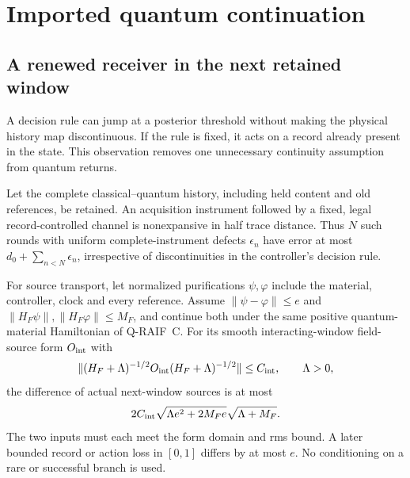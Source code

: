 \section{Imported quantum continuation}\label{app:quantum_imports}
\subsection{A renewed receiver in the next retained window}
\label{subsec:continuation}

A decision rule can jump at a posterior threshold without making the
physical history map discontinuous. If the rule is fixed, it acts on a
record already present in the state. This observation removes one
unnecessary continuity assumption from quantum returns.

\begin{proposition}
\label{prop:continuation}
Let the complete classical--quantum history, including held content
and old references, be retained. An acquisition instrument followed
by a fixed, legal record-controlled channel is nonexpansive in half
trace distance. Thus $N$ such rounds with uniform complete-instrument
defects $\epsilon_n$ have error at most $d_0+\sum_{n<N}\epsilon_n$,
irrespective of discontinuities in the controller's decision rule.

For source transport, let normalized purifications $\psi,\varphi$
include the material, controller, clock and every reference. Assume
$\|\psi-\varphi\|\le e$ and
$\|H_F\psi\|,\|H_F\varphi\|\le M_F$, and continue both under the
same positive quantum-material Hamiltonian of Q-RAIF~C.
For its smooth interacting-window field-source form $O_{\rm int}$
with
\[
 \|(H_F+\Lambda)^{-1/2}O_{\rm int}
                      (H_F+\Lambda)^{-1/2}\|\le C_{\rm int},
 \qquad \Lambda>0,
\]
the difference of actual next-window sources is at most
\begin{equation}\label{eq:nextsource}
 2C_{\rm int}\sqrt{\Lambda e^2+2M_Fe}\sqrt{\Lambda+M_F}.
\end{equation}
The two inputs must each meet the form domain and rms bound.
A later bounded record or action loss in $[0,1]$ differs by at most $e$.
No conditioning on a rare or successful branch is used.
\end{proposition}
